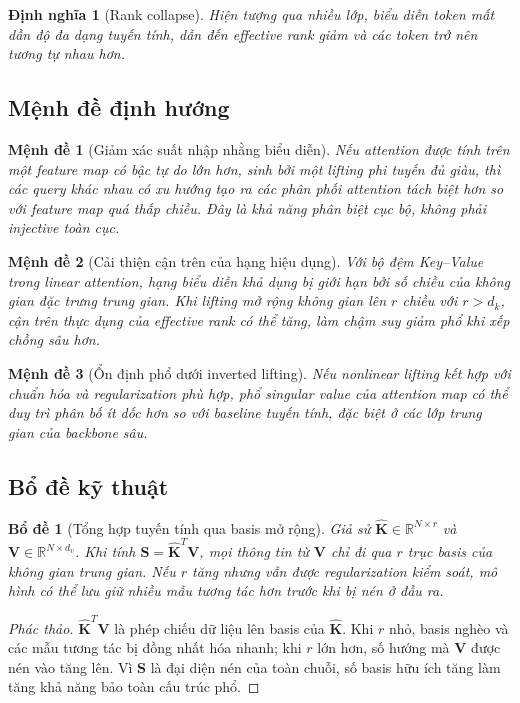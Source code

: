 \documentclass[12pt,a4paper]{article}
\newtheorem{lemma}{Bổ đề}[section]
\newtheorem{proposition}{Mệnh đề}[section]
\newtheorem{definition}{Định nghĩa}[section]
\begin{document}
\begin{definition}[Rank collapse]
Hiện tượng qua nhiều lớp, biểu diễn token mất dần độ đa dạng tuyến tính, dẫn đến effective rank
giảm và các token trở nên tương tự nhau hơn.
\end{definition}

\subsection{Mệnh đề định hướng}
\begin{proposition}[Giảm xác suất nhập nhằng biểu diễn]
Nếu attention được tính trên một feature map có bậc tự do lớn hơn, sinh bởi một lifting phi tuyến đủ
giàu, thì các query khác nhau có xu hướng tạo ra các phân phối attention tách biệt hơn so với feature
map quá thấp chiều. Đây là khả năng phân biệt cục bộ, không phải injective toàn cục.
\end{proposition}

\begin{proposition}[Cải thiện cận trên của hạng hiệu dụng]
Với bộ đệm Key--Value trong linear attention, hạng biểu diễn khả dụng bị giới hạn bởi số chiều của
không gian đặc trưng trung gian. Khi lifting mở rộng không gian lên $r$ chiều với $r > d_k$, cận trên
thực dụng của effective rank có thể tăng, làm chậm suy giảm phổ khi xếp chồng sâu hơn.
\end{proposition}

\begin{proposition}[Ổn định phổ dưới inverted lifting]
Nếu nonlinear lifting kết hợp với chuẩn hóa và regularization phù hợp, phổ singular value của
attention map có thể duy trì phân bố ít dốc hơn so với baseline tuyến tính, đặc biệt ở các lớp trung
gian của backbone sâu.
\end{proposition}

\subsection{Bổ đề kỹ thuật}
\begin{lemma}[Tổng hợp tuyến tính qua basis mở rộng]
Giả sử $\hat{\mathbf{K}} \in \mathbb{R}^{N \times r}$ và $\mathbf{V} \in \mathbb{R}^{N \times d_v}$.
Khi tính $\mathbf{S}=\hat{\mathbf{K}}^T\mathbf{V}$, mọi thông tin từ $\mathbf{V}$ chỉ đi qua $r$ trục
basis của không gian trung gian. Nếu $r$ tăng nhưng vẫn được regularization kiểm soát, mô hình có
thể lưu giữ nhiều mẫu tương tác hơn trước khi bị nén ở đầu ra.
\end{lemma}
\begin{proof}[Phác thảo]
$\hat{\mathbf{K}}^T\mathbf{V}$ là phép chiếu dữ liệu lên basis của $\hat{\mathbf{K}}$. Khi $r$ nhỏ,
basis nghèo và các mẫu tương tác bị đồng nhất hóa nhanh; khi $r$ lớn hơn, số hướng mà $\mathbf{V}$
được nén vào tăng lên. Vì $\mathbf{S}$ là đại diện nén của toàn chuỗi, số basis hữu ích tăng làm
tăng khả năng bảo toàn cấu trúc phổ.
\end{proof}
\end{document}
